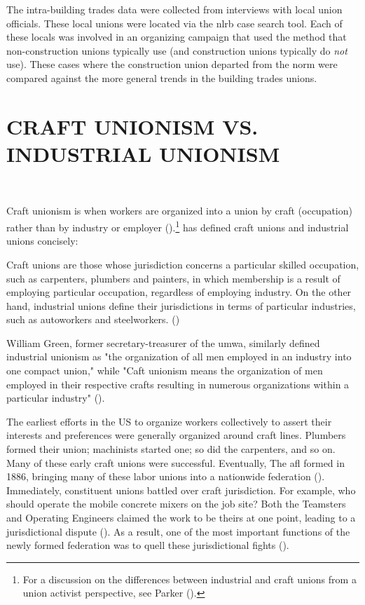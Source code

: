 \documentclass[12pt]{article}
\renewenvironment{quote}
  {\list{}{\leftmargin=\parindent\rightmargin=0pt}%
   \item\relax}
  {\endlist}
\begin{document}
The intra-building trades data were collected from interviews with local union officials. These local unions were located via the \acrfull{nlrb} case search tool. Each of these locals was involved in an organizing campaign that used the method that non-construction unions typically use (and construction unions typically do \textit{not} use). These cases where the construction union departed from the norm were compared against the more general trends in the building trades unions.

\section{CRAFT UNIONISM VS. INDUSTRIAL UNIONISM}\label{sec:craft_vs_industrial} \

Craft unionism is when workers are organized into a union by craft (occupation) rather than by industry or employer (\cite[97]{suffernCraftVsIndustrial1936}).\footnote{For a discussion on the differences between industrial and craft unions from a union activist perspective, see Parker (\citeyear{parkerAreIndustrialUnions2008}).} \citeauthor{ohCraftIndustrialUnions1989} has defined craft unions and industrial unions concisely:

\begin{quote}
Craft unions are those whose jurisdiction concerns a particular skilled occupation, such as carpenters, plumbers and painters, in which membership is a result of employing particular occupation, regardless of employing industry. On the other hand, industrial unions define their jurisdictions in terms of particular industries, such as autoworkers and steelworkers. (\citeyear[2]{ohCraftIndustrialUnions1989})
\end{quote}

\noindent William Green, former secretary-treasurer of the \acrfull{umwa}, similarly defined industrial unionism as "the organization of all men employed in an industry into one compact union," while "Caft unionism means the organization of men employed in their respective crafts resulting in numerous organizations within a particular industry" (\cite[69–70]{sapossIndustrialUnionism1935}).

The earliest efforts in the US to organize workers collectively to assert their interests and preferences were generally organized around craft lines. Plumbers formed their union; machinists started one; so did the carpenters, and so on. Many of these early craft unions were successful. Eventually, The \acrfull{afl} formed in 1886, bringing many of these labor unions into a nationwide federation (\cite[97]{suffernCraftVsIndustrial1936}). Immediately, constituent unions battled over craft jurisdiction. For example, who should operate the mobile concrete mixers on the job site? Both the Teamsters and Operating Engineers claimed the work to be theirs at one point, leading to a jurisdictional dispute (\cite{jaffe1940}). As a result, one of the most important functions of the newly formed federation was to quell these jurisdictional fights (\cite{jaffe1940}).
\end{document}
